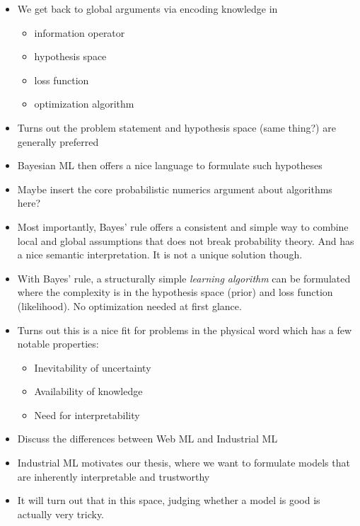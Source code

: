 \begin{itemize}
    \item We get back to global arguments via encoding knowledge in
          \begin{itemize}
              \item information operator
              \item hypothesis space
              \item loss function
              \item optimization algorithm
          \end{itemize}
    \item Turns out the problem statement and hypothesis space (same thing?) are generally preferred
    \item Bayesian ML then offers a nice language to formulate such hypotheses
    \item Maybe insert the core probabilistic numerics argument about algorithms here?
    \item Most importantly, Bayes' rule offers a consistent and simple way to combine local and global assumptions that does not break probability theory.
          And has a nice semantic interpretation.
          It is not a unique solution though.
    \item With Bayes' rule, a structurally simple \emph{learning algorithm} can be formulated where the complexity is in the hypothesis space (prior) and loss function (likelihood). No optimization needed at first glance.
    \item Turns out this is a nice fit for problems in the physical word which has a few notable properties:
          \begin{itemize}
              \item Inevitability of uncertainty
              \item Availability of knowledge
              \item Need for interpretability
          \end{itemize}
    \item Discuss the differences between Web ML and Industrial ML
    \item Industrial ML motivates our thesis, where we want to formulate models that are inherently interpretable and trustworthy
    \item It will turn out that in this space, judging whether a model is good is actually very tricky.
\end{itemize}


